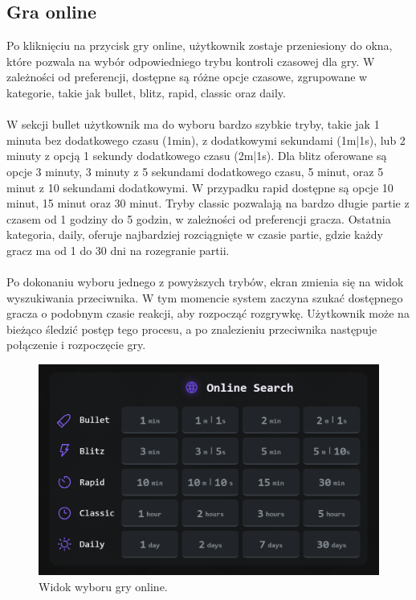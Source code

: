 \documentclass[12pt,a4paper]{article}
\begin{document}
\newpage
\subsection{Gra online}
Po kliknięciu na przycisk gry online, użytkownik zostaje przeniesiony do okna, które pozwala na wybór odpowiedniego trybu kontroli czasowej dla gry. W zależności od preferencji, dostępne są różne opcje czasowe, zgrupowane w kategorie, takie jak bullet, blitz, rapid, classic oraz daily.
\\\\
W sekcji bullet użytkownik ma do wyboru bardzo szybkie tryby, takie jak 1 minuta bez dodatkowego czasu (1min), z dodatkowymi sekundami (1m|1s), lub 2 minuty z opcją 1 sekundy dodatkowego czasu (2m|1s). Dla blitz oferowane są opcje 3 minuty, 3 minuty z 5 sekundami dodatkowego czasu, 5 minut, oraz 5 minut z 10 sekundami dodatkowymi. W przypadku rapid dostępne są opcje 10 minut, 15 minut oraz 30 minut. Tryby classic pozwalają na bardzo długie partie z czasem od 1 godziny do 5 godzin, w zależności od preferencji gracza. Ostatnia kategoria, daily, oferuje najbardziej rozciągnięte w czasie partie, gdzie każdy gracz ma od 1 do 30 dni na rozegranie partii.
\\\\
Po dokonaniu wyboru jednego z powyższych trybów, ekran zmienia się na widok wyszukiwania przeciwnika. W tym momencie system zaczyna szukać dostępnego gracza o podobnym czasie reakcji, aby rozpocząć rozgrywkę. Użytkownik może na bieżąco śledzić postęp tego procesu, a po znalezieniu przeciwnika następuje połączenie i rozpoczęcie gry.

\begin{figure}[h!]
    \centering
    \includegraphics[width=1\textwidth]{zdj/ins_min_pvp.png}
    \caption{Widok wyboru gry online.}
\end{figure}
\end{document}
